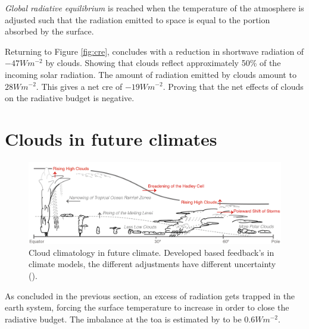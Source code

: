 \textit{Global radiative equilibrium} is reached when the temperature of the atmosphere is adjusted such that the radiation emitted to space is equal to the portion absorbed by the surface.

Returning to Figure \ref{fig:cre}, \citeauthor{Wild2019TheModels} concludes with a reduction in shortwave radiation of $-47Wm^{-2}$ by clouds. Showing that clouds reflect approximately 50\% of the incoming solar radiation. The amount of radiation emitted by clouds amount to $28Wm^{-2}$. This gives a net \acrshort{cre} of $-19Wm^{-2}$. Proving that the net effects of clouds on the radiative budget is negative. 

\section{Clouds in future climates} \label{sec:intro_cloud_future_climates}
\begin{figure}[h]
    \centering
    \includegraphics[scale = 0.8]{Chapter1_Intro/images/Fig7-11_ipcc.jpg}
    \caption{Cloud climatology in future climate. Developed based feedback's in climate models, the different adjustments have different uncertainty (\cite{IPCC_CH7_clouds}).}
    \label{fig:cloud_scheme}
\end{figure}
As concluded in the previous section, an excess of radiation gets trapped in the earth system, forcing the surface temperature to increase in order to close the radiative budget. The imbalance at the \acrshort{toa} is estimated by \citeauthor{Wild2019TheModels} to be $0.6W m^{-2}$. 
